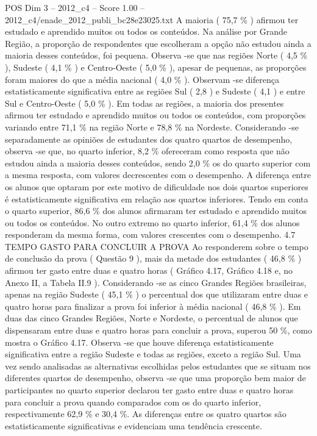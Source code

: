 \begin{textsample}{POS Dim 3 – 2012\_c4 – Score 1.00 – 2012\_c4/enade\_2012\_publi\_bc28e23025.txt}
A maioria ( 75,7 \% ) afirmou ter estudado e aprendido muitos ou todos os conteúdos.
Na análise por Grande Região, a proporção de respondentes que escolheram a opção não estudou ainda a maioria desses conteúdos, foi pequena.
Observa -se que nas regiões Norte ( 4,5 \% ), Sudeste ( 4,1 \% ) e Centro-Oeste ( 5,0 \% ), apesar de pequenas, as proporções foram maiores do que a média nacional ( 4,0 \% ).
Observam -se diferença estatisticamente significativa entre as regiões Sul ( 2,8 ) e Sudeste ( 4,1 ) e entre Sul e Centro-Oeste ( 5,0 \% ).
Em todas as regiões, a maioria dos presentes afirmou ter estudado e aprendido muitos ou todos os conteúdos, com proporções variando entre 71,1 \% na região Norte e 78,8 \% na Nordeste.
Considerando -se separadamente as opiniões de estudantes dos quatro quartos de desempenho, observa -se que, no quarto inferior, 8,2 \% ofereceram como resposta que não estudou ainda a maioria desses conteúdos, sendo 2,0 \% os do quarto superior com a mesma resposta, com valores decrescentes com o desempenho.
A diferença entre os alunos que optaram por este motivo de dificuldade nos dois quartos superiores é estatisticamente significativa em relação aos quartos inferiores.
Tendo em conta o quarto superior, 86,6 \% dos alunos afirmaram ter estudado e aprendido muitos ou todos os conteúdos.
No outro extremo no quarto inferior, 61,4 \% dos alunos responderam da mesma forma, com valores crescentes com o desempenho. 4.7 TEMPO GASTO PARA CONCLUIR A PROVA Ao responderem sobre o tempo de conclusão da prova ( Questão 9 ), mais da metade dos estudantes ( 46,8 \% ) afirmou ter gasto entre duas e quatro horas ( Gráfico 4.17, Gráfico 4.18 e, no Anexo II, a Tabela II.9 ).
Considerando -se as cinco Grandes Regiões brasileiras, apenas na região Sudeste ( 45,1 \% ) o percentual dos que utilizaram entre duas e quatro horas para finalizar a prova foi inferior à média nacional ( 46,8 \% ).
Em duas das cinco Grandes Regiões, Norte e Nordeste, o percentual de alunos que dispensaram entre duas e quatro horas para concluir a prova, superou 50 \%, como mostra o Gráfico 4.17.
Observa -se que houve diferença estatisticamente significativa entre a região Sudeste e todas as regiões, exceto a região Sul.
Uma vez sendo analisadas as alternativas escolhidas pelos estudantes que se situam nos diferentes quartos de desempenho, observa -se que uma proporção bem maior de participantes no quarto superior declarou ter gasto entre duas e quatro horas para concluir a prova quando comparados com os do quarto inferior, respectivamente 62,9 \% e 30,4 \%.
As diferenças entre os quatro quartos são estatisticamente significativas e evidenciam uma tendência crescente.

\end{textsample}

